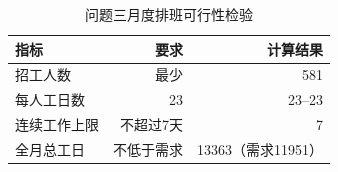 \begin{table}[htbp]\centering
\caption{问题三月度排班可行性检验}\label{tab:roster-check}
\begin{tabular}{lrr}\toprule 指标 & 要求 & 计算结果\\\midrule
招工人数 & 最少 & 581\\
每人工日数 & 23 & 23--23\\
连续工作上限 & 不超过7天 & 7\\
全月总工日 & 不低于需求 & 13363（需求11951）\\
\bottomrule\end{tabular}\end{table}